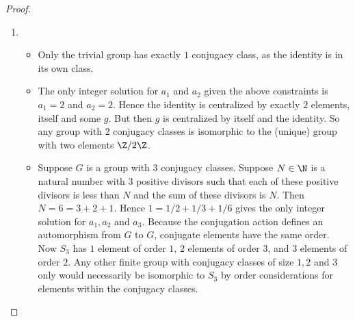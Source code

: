 \documentclass[onesided]{ccg-pset}
\begin{document}
\begin{enumerate}
\begin{proof}
\begin{enumerate}
        \item 
          \begin{itemize}
              \item Only the trivial group has exactly $1$ conjugacy class, as the identity is in its own class.
              \item The only integer solution for $a_1$ and $a_2$ given the above constraints is $a_1 = 2$ and $a_2 = 2$. Hence the identity is centralized by exactly $2$ elements, itself and some $g$. But then $g$ is centralized by itself and the identity. So any group with $2$ conjugacy classes is isomorphic to the (unique) group with two elements $\Z/2\Z$.
              \item Suppose $G$ is a group with $3$ conjugacy classes. Suppose $N \in \N$ is a natural number with $3$ positive divisors such that each of these positive divisors is less than $N$ and the sum of these divisors is $N$. Then $N = 6 = 3 + 2 + 1$. Hence $1 = 1/2 + 1/3 + 1/6$ gives the only integer solution for $a_1, a_2$ and $a_3$. Because the conjugation action defines an automorphism from $G$ to $G$, conjugate elements have the same order. Now $S_3$ has $1$ element of order $1$, $2$ elements of order $3$, and $3$ elements of order $2$. Any other finite group with conjugacy classes of size $1, 2$ and $3$ only would necessarily be isomorphic to $S_3$ by order considerations for elements within the conjugacy classes.
          \end{itemize}
    \end{enumerate}
    \end{proof}
\end{enumerate}
\end{document}
